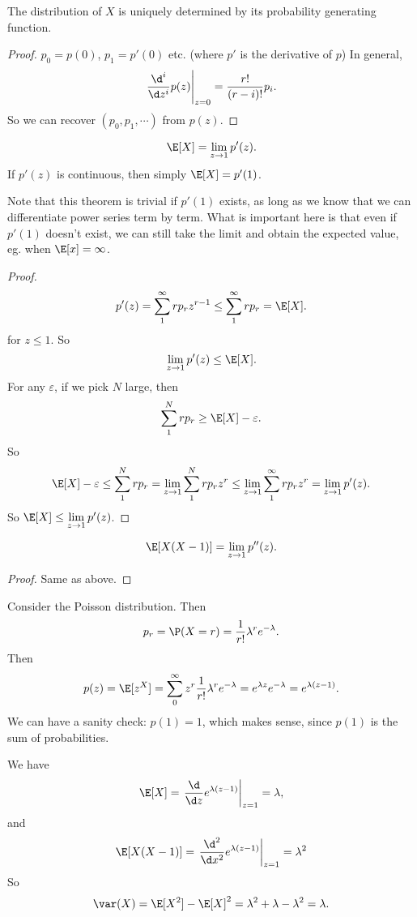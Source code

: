 \documentclass[a4paper]{article}
\begin{document}
\begin{thm}
  The distribution of $X$ is uniquely determined by its probability generating function.
\end{thm}

\begin{proof}
  $p_0 = p(0)$, $p_1 = p'(0)$ etc. (where $p'$ is the derivative of $p$) In general,
  \[
    \left. \frac{\d ^i}{\d z^i}p(z) \right|_{z = 0} = \frac{r!}{(r - i)!}p_i.
  \]
  So we can recover $(p_0, p_1, \cdots)$ from $p(z)$.
\end{proof}

\begin{thm}
  \[
    \E[X] = \lim_{z\to 1}p'(z).
  \]
  If $p'(z)$ is continuous, then simply $\E[X] = p'(1)$.
\end{thm}
Note that this theorem is trivial if $p'(1)$ exists, as long as we know that we can differentiate power series term by term. What is important here is that even if $p'(1)$ doesn't exist, we can still take the limit and obtain the expected value, eg. when $\E[x] = \infty$.

\begin{proof}
  \[
    p'(z) = \sum_1^\infty rp_r z^{r - 1} \leq \sum_1^\infty rp_r = \E[X].
  \]
  for $z \leq 1$. So
  \[
    \lim_{z\to 1}p'(z) \leq \E[X].
  \]
  For any $\varepsilon$, if we pick $N$ large, then
  \[
    \sum_{1}^N rp_r \geq \E[X] - \varepsilon.
  \]
  So
  \[
    \E[X] - \varepsilon \leq \sum_1^N rp_r = \lim_{z\to 1}\sum _1^N rp_r z^r\leq \lim_{z \to 1} \sum_1^\infty rp_r z^r = \lim_{z\to 1} p' (z).
  \]
  So $\E[X] \leq \lim\limits_{z \to 1}p'(z)$.
\end{proof}

\begin{thm}
  \[
    \E[X(X - 1)] = \lim_{z \to 1}p''(z).
  \]
\end{thm}
\begin{proof}
  Same as above.
\end{proof}

\begin{eg}
  Consider the Poisson distribution. Then
  \[
    p_r = \P(X = r) = \frac{1}{r!}\lambda^r e^{-\lambda}.
  \]
  Then
  \[
    p(z) = \E[z^X] = \sum_0^\infty z^r \frac{1}{r!}\lambda^r e^{-\lambda} = e^{\lambda z}e^{-\lambda} = e^{\lambda(z - 1)}.
  \]
  We can have a sanity check: $p(1) = 1$, which makes sense, since $p(1)$ is the sum of probabilities.

  We have
  \[
    \E[X]= \left.\frac{\d }{\d z}e^{\lambda(z - 1)}\right|_{z = 1} = \lambda,
  \]
  and
  \[
    \E[X(X - 1)] = \left.\frac{\d ^2}{\d x^2}e^{\lambda(z - 1)}\right|_{z = 1} = \lambda^2
  \]
  So
  \[
    \var(X) = \E[X^2] - \E[X]^2 = \lambda^2 + \lambda - \lambda^2 = \lambda.
  \]
\end{eg}
\end{document}
